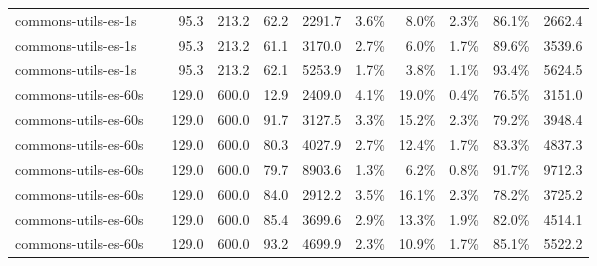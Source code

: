 \begin{tabular}{llrrrrrrrrr}
  {reporttablerow}\label{tabrow:tab-teralizer-stage-runtimes:commons-utils-es-1s@3AIMPROVED_10_TRIES}commons-utils-es-1s & \VariantImprovedA{} & 95.3 & 213.2 & 62.2 & 2291.7 & 3.6\% & 8.0\% & 2.3\% & 86.1\% & 2662.4 \\
  {reporttablerow}\label{tabrow:tab-teralizer-stage-runtimes:commons-utils-es-1s@3AIMPROVED_50_TRIES}commons-utils-es-1s & \VariantImprovedB{} & 95.3 & 213.2 & 61.1 & 3170.0 & 2.7\% & 6.0\% & 1.7\% & 89.6\% & 3539.6 \\
  {reporttablerow}\label{tabrow:tab-teralizer-stage-runtimes:commons-utils-es-1s@3AIMPROVED_200_TRIES}commons-utils-es-1s & \VariantImprovedC{} & 95.3 & 213.2 & 62.1 & 5253.9 & 1.7\% & 3.8\% & 1.1\% & 93.4\% & 5624.5 \\
  \midrule
  {reporttablerow}\label{tabrow:tab-teralizer-stage-runtimes:commons-utils-es-60s@3ABASELINE}commons-utils-es-60s & \VariantBaseline{} & 129.0 & 600.0 & 12.9 & 2409.0 & 4.1\% & 19.0\% & 0.4\% & 76.5\% & 3151.0 \\
  {reporttablerow}\label{tabrow:tab-teralizer-stage-runtimes:commons-utils-es-60s@3ANAIVE_10_TRIES}commons-utils-es-60s & \VariantNaiveA{} & 129.0 & 600.0 & 91.7 & 3127.5 & 3.3\% & 15.2\% & 2.3\% & 79.2\% & 3948.4 \\
  {reporttablerow}\label{tabrow:tab-teralizer-stage-runtimes:commons-utils-es-60s@3ANAIVE_50_TRIES}commons-utils-es-60s & \VariantNaiveB{} & 129.0 & 600.0 & 80.3 & 4027.9 & 2.7\% & 12.4\% & 1.7\% & 83.3\% & 4837.3 \\
  {reporttablerow}\label{tabrow:tab-teralizer-stage-runtimes:commons-utils-es-60s@3ANAIVE_200_TRIES}commons-utils-es-60s & \VariantNaiveC{} & 129.0 & 600.0 & 79.7 & 8903.6 & 1.3\% & 6.2\% & 0.8\% & 91.7\% & 9712.3 \\
  {reporttablerow}\label{tabrow:tab-teralizer-stage-runtimes:commons-utils-es-60s@3AIMPROVED_10_TRIES}commons-utils-es-60s & \VariantImprovedA{} & 129.0 & 600.0 & 84.0 & 2912.2 & 3.5\% & 16.1\% & 2.3\% & 78.2\% & 3725.2 \\
  {reporttablerow}\label{tabrow:tab-teralizer-stage-runtimes:commons-utils-es-60s@3AIMPROVED_50_TRIES}commons-utils-es-60s & \VariantImprovedB{} & 129.0 & 600.0 & 85.4 & 3699.6 & 2.9\% & 13.3\% & 1.9\% & 82.0\% & 4514.1 \\
  {reporttablerow}\label{tabrow:tab-teralizer-stage-runtimes:commons-utils-es-60s@3AIMPROVED_200_TRIES}commons-utils-es-60s & \VariantImprovedC{} & 129.0 & 600.0 & 93.2 & 4699.9 & 2.3\% & 10.9\% & 1.7\% & 85.1\% & 5522.2 \\

\end{tabular}
